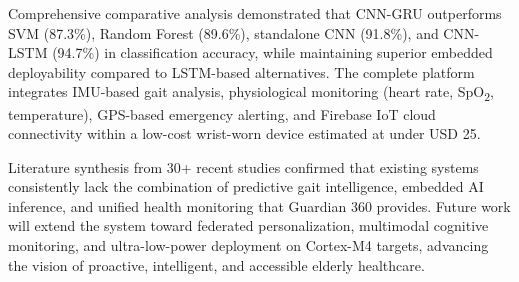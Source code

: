\documentclass[conference]{IEEEtran}
\begin{document}
Comprehensive comparative analysis demonstrated that CNN-GRU outperforms SVM (87.3\%), Random Forest (89.6\%), standalone CNN (91.8\%), and CNN-LSTM (94.7\%) in classification accuracy, while maintaining superior embedded deployability compared to LSTM-based alternatives. The complete platform integrates IMU-based gait analysis, physiological monitoring (heart rate, SpO\textsubscript{2}, temperature), GPS-based emergency alerting, and Firebase IoT cloud connectivity within a low-cost wrist-worn device estimated at under USD 25.

Literature synthesis from 30+ recent studies confirmed that existing systems consistently lack the combination of predictive gait intelligence, embedded AI inference, and unified health monitoring that Guardian 360 provides. Future work will extend the system toward federated personalization, multimodal cognitive monitoring, and ultra-low-power deployment on Cortex-M4 targets, advancing the vision of proactive, intelligent, and accessible elderly healthcare.
\end{document}
